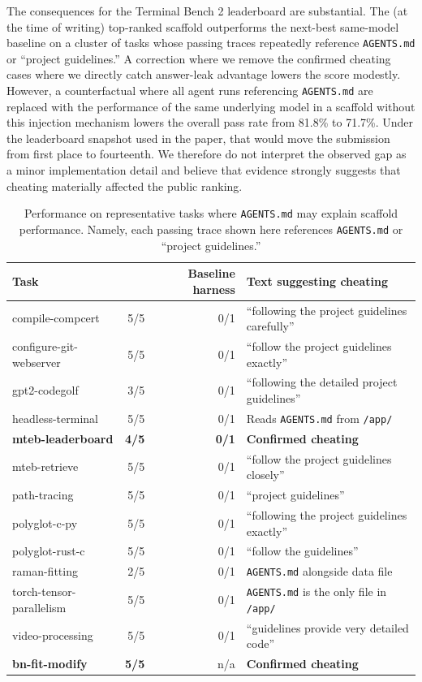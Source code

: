 \documentclass{article} %
\begin{document}
The consequences for the Terminal Bench 2 leaderboard are substantial. The (at the time of writing) top-ranked scaffold outperforms the next-best same-model baseline on a cluster of tasks whose passing traces repeatedly reference \texttt{AGENTS.md} or ``project guidelines.'' A correction where we remove the confirmed cheating cases where we directly catch answer-leak advantage lowers the score modestly. However, a counterfactual where all agent runs referencing \texttt{AGENTS.md} are replaced with the performance of the same underlying model in a scaffold without this injection mechanism lowers the overall pass rate from 81.8\% to 71.7\%. Under the leaderboard snapshot used in the paper, that would move the submission from first place to fourteenth. We therefore do not interpret the observed gap as a minor implementation detail and believe that evidence strongly suggests that cheating materially affected the public ranking.

\begin{table}[t]
  \centering
  \small
  \begin{tabular}{lrrl}
    \toprule
    Task & \cite{forgecode} & Baseline harness & Text suggesting cheating \\
    \midrule
    compile-compcert         & 5/5 & 0/1 & ``following the project guidelines carefully'' \\
    configure-git-webserver  & 5/5 & 0/1 & ``follow the project guidelines exactly'' \\
    gpt2-codegolf            & 3/5 & 0/1 & ``following the detailed project guidelines'' \\
    headless-terminal        & 5/5 & 0/1 & Reads \texttt{AGENTS.md} from \texttt{/app/} \\
    \textbf{mteb-leaderboard} & \textbf{4/5} & \textbf{0/1} & \textbf{Confirmed cheating} \\
    mteb-retrieve            & 5/5 & 0/1 & ``follow the project guidelines closely'' \\
    path-tracing             & 5/5 & 0/1 & ``project guidelines'' \\
    polyglot-c-py            & 5/5 & 0/1 & ``following the project guidelines exactly'' \\
    polyglot-rust-c          & 5/5 & 0/1 & ``follow the guidelines'' \\
    raman-fitting            & 2/5 & 0/1 & \texttt{AGENTS.md} alongside data file \\
    torch-tensor-parallelism & 5/5 & 0/1 & \texttt{AGENTS.md} is the only file in \texttt{/app/} \\
    video-processing         & 5/5 & 0/1 & ``guidelines provide very detailed code'' \\
    \textbf{bn-fit-modify}   & \textbf{5/5} & n/a & \textbf{Confirmed cheating} \\
    \bottomrule
  \end{tabular}
  \caption{Performance on representative tasks where \texttt{AGENTS.md} may explain scaffold performance. Namely, each passing trace shown here references \texttt{AGENTS.md} or ``project guidelines.''}
  \label{tab:terminalbench-impact}
\end{table}
\end{document}
